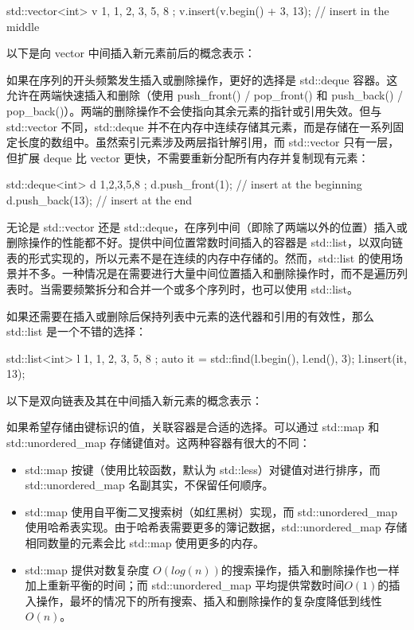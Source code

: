 \begin{cpp}
std::vector<int> v{ 1, 1, 2, 3, 5, 8 };
v.insert(v.begin() + 3, 13); // insert in the middle
\end{cpp}

以下是向 vector 中间插入新元素前后的概念表示：


如果在序列的开头频繁发生插入或删除操作，更好的选择是 std::deque 容器。这允许在两端快速插入和删除（使用 push\_front() / pop\_front() 和 push\_back() / pop\_back()）。两端的删除操作不会使指向其余元素的指针或引用失效。但与 std::vector 不同，std::deque 并不在内存中连续存储其元素，而是存储在一系列固定长度的数组中。虽然索引元素涉及两层指针解引用，而 std::vector 只有一层，但扩展 deque 比 vector 更快，不需要重新分配所有内存并复制现有元素：

\begin{cpp}
std::deque<int> d{ 1,2,3,5,8 };
d.push_front(1); // insert at the beginning
d.push_back(13); // insert at the end
\end{cpp}

无论是 std::vector 还是 std::deque，在序列中间（即除了两端以外的位置）插入或删除操作的性能都不好。提供中间位置常数时间插入的容器是 std::list，以双向链表的形式实现的，所以元素不是在连续的内存中存储的。然而，std::list 的使用场景并不多。一种情况是在需要进行大量中间位置插入和删除操作时，而不是遍历列表时。当需要频繁拆分和合并一个或多个序列时，也可以使用 std::list。

如果还需要在插入或删除后保持列表中元素的迭代器和引用的有效性，那么 std::list 是一个不错的选择：

\begin{cpp}
std::list<int> l{ 1, 1, 2, 3, 5, 8 };
auto it = std::find(l.begin(), l.end(), 3);
l.insert(it, 13);
\end{cpp}

以下是双向链表及其在中间插入新元素的概念表示：


如果希望存储由键标识的值，关联容器是合适的选择。可以通过 std::map 和 std::unordered\_map 存储键值对。这两种容器有很大的不同：

\begin{itemize}
\item
std::map 按键（使用比较函数，默认为 std::less）对键值对进行排序，而 std::unordered\_map 名副其实，不保留任何顺序。

\item
std::map 使用自平衡二叉搜索树（如红黑树）实现，而 std::unordered\_map 使用哈希表实现。由于哈希表需要更多的簿记数据，std::unordered\_map 存储相同数量的元素会比 std::map 使用更多的内存。

\item
std::map 提供对数复杂度 $O(log(n))$的搜索操作，插入和删除操作也一样加上重新平衡的时间；而 std::unordered\_map 平均提供常数时间$O(1)$的插入操作，最坏的情况下的所有搜索、插入和删除操作的复杂度降低到线性$O(n)$。
\end{itemize}


